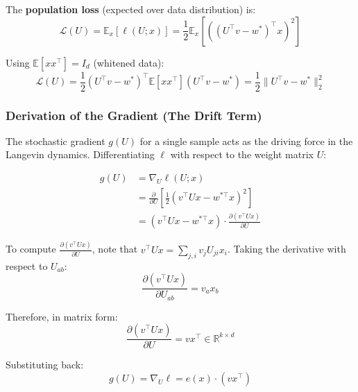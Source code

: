 \documentclass[
  journal=largetwo,
  year=2025,
  volume=37,
]{cup-journal}
\begin{document}
The \textbf{population loss} (expected over data distribution) is:
\begin{equation}\label{eq:population_loss}
    \mathcal{L}(U) = \mathbb{E}_x [\ell(U; x)] = \frac{1}{2} \mathbb{E}_x \left[ \left( (U^\top v - w^*)^\top x \right)^2 \right]
\end{equation}

Using $\mathbb{E}[x x^\top] = I_d$ (whitened data):
\begin{equation}
    \mathcal{L}(U) = \frac{1}{2} (U^\top v - w^*)^\top \mathbb{E}[x x^\top] (U^\top v - w^*) = \frac{1}{2} \| U^\top v - w^* \|_2^2
\end{equation}



\subsubsection{Derivation of the Gradient (The Drift Term)}

The stochastic gradient $g(U)$ for a single sample acts as the driving force in the Langevin dynamics. Differentiating $\ell$ with respect to the weight matrix $U$:

\begin{align}
    g(U) &= \nabla_U \ell(U; x) \nonumber \\
    &= \frac{\partial}{\partial U} \left[ \frac{1}{2} (v^\top U x - w^{*\top} x)^2 \right] \nonumber \\
    &= (v^\top U x - w^{*\top} x) \cdot \frac{\partial (v^\top U x)}{\partial U}
\end{align}

To compute $\frac{\partial (v^\top U x)}{\partial U}$, note that $v^\top U x = \sum_{j,i} v_j U_{ji} x_i$. Taking the derivative with respect to $U_{ab}$:
\begin{equation}
    \frac{\partial (v^\top U x)}{\partial U_{ab}} = v_a x_b
\end{equation}

Therefore, in matrix form:
\begin{equation}
    \frac{\partial (v^\top U x)}{\partial U} = v x^\top \in \mathbb{R}^{k \times d}
\end{equation}

Substituting back:
\begin{equation}\label{eq:gradient_explicit}
    \boxed{g(U) = \nabla_U \ell = e(x) \cdot (v x^\top)}
\end{equation}
\end{document}
